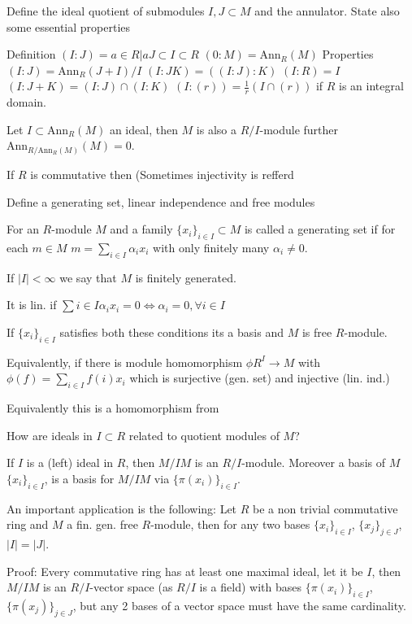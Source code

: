 Define the ideal quotient of submodules \(I, J \subset M\) and the annulator. State also some essential properties

Definition
\((I : J) = {a \in R | aJ \subset I } \subset R\)
\((0 : M) = \text{Ann}_R(M)\)
Properties
\((I : J) = \text{Ann}_R(J + I)/I\)
\((I : JK) = ((I : J) : K)\) 
\((I : R) = I\) 
\((I : J + K) = (I : J) \cap (I : K)\) 
\((I : (r)) = \frac{1}{r}(I \cap (r))\) if \(R\) is an integral domain.

Let \(I \subset \text{Ann}_R(M)\) an ideal, then \(M\) is also a \(R/I\)-module
further \(\text{Ann}_{R/\text{Ann}_R(M)}(M) = 0\).

If \(R\) is commutative then 
(Sometimes injectivity is refferd


Define a generating set, linear independence and free modules

For an \(R\)-module \(M\) and a family \(\{x_i\}_{i \in I} \subset M\)
is called a generating set if for each \(m \in M\)
\(m = \sum_{i \in I} \alpha_i x_i\) with only finitely many \(\alpha_i \neq 0\).

If \(|I| < \infty\) we say that \(M\) is finitely generated.

It is lin. if 
\(\sum{i \in I} \alpha_i x_i = 0 \iff \alpha_i = 0, \forall i \in I\)

If \(\{x_i\}_{i \in I}\) satisfies both these conditions its a basis 
and \(M\) is free \(R\)-module.

Equivalently, if there is module homomorphism \(\phi R^{I} \to M\) with \(\phi(f) = \sum_{i \in I} f(i) x_i\)
which is surjective (gen. set) and injective (lin. ind.) 

Equivalently this is a homomorphism from 

How are ideals in \(I \subset R\) related to quotient modules of \(M\)?

If \(I\) is a (left) ideal in \(R\), then \(M/IM\) is an \(R/I\)-module.
Moreover a basis of \(M\) \(\{x_i\}_{i \in I}\), is a basis for \(M/IM\) via \(\{\pi(x_i)\}_{i \in I}\).

An important application is the following:
Let \(R\) be a non trivial commutative ring and \(M\) a fin. gen. free \(R\)-module, then for any two bases
\(\{x_i\}_{i \in I}\), \(\{x_j\}_{j \in J}\), \(|I| = |J|\).

Proof:
Every commutative ring has at least one maximal ideal, let it be \(I\), then \(M/IM\) is an \(R/I\)-vector space (as \(R/I\) is a field)
with bases \(\{\pi(x_i)\}_{i \in I}\), \(\{\pi(x_j)\}_{j \in J}\), but any 2 bases of a vector space must have the same cardinality.



